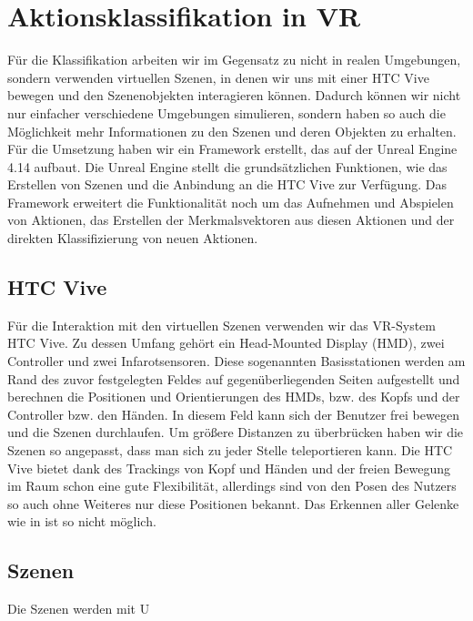 
\section{Aktionsklassifikation in VR}

Für die Klassifikation arbeiten wir im Gegensatz zu \cite{SceneGronk} nicht in realen Umgebungen, sondern verwenden virtuellen Szenen, in denen wir uns mit einer HTC Vive \cite{HTC-Vive} bewegen und den Szenenobjekten interagieren können. Dadurch können wir nicht nur einfacher verschiedene Umgebungen simulieren, sondern haben so auch die Möglichkeit mehr Informationen zu den Szenen und deren Objekten zu erhalten.
Für die Umsetzung haben wir ein Framework erstellt, das auf der Unreal Engine 4.14 \cite{UE4} aufbaut. Die Unreal Engine stellt die grundsätzlichen Funktionen, wie das Erstellen von Szenen und die Anbindung an die HTC Vive zur Verfügung. Das Framework erweitert die Funktionalität noch um das Aufnehmen und Abspielen von Aktionen, das Erstellen der Merkmalsvektoren aus diesen Aktionen \cite{Features} und der direkten Klassifizierung von neuen Aktionen.

\subsection{HTC Vive}
Für die Interaktion mit den virtuellen Szenen verwenden wir das VR-System HTC Vive. Zu dessen Umfang gehört ein Head-Mounted Display (HMD), zwei Controller und zwei Infarotsensoren. Diese sogenannten Basisstationen werden am Rand des zuvor festgelegten Feldes auf gegenüberliegenden Seiten aufgestellt und berechnen die Positionen und Orientierungen des HMDs, bzw. des Kopfs und der Controller bzw. den Händen. In diesem Feld kann sich der Benutzer frei bewegen und die Szenen durchlaufen. Um größere Distanzen zu überbrücken haben wir die Szenen so angepasst, dass man sich zu jeder Stelle teleportieren kann. Die HTC Vive bietet dank des Trackings von Kopf und Händen und der freien Bewegung im Raum schon eine gute Flexibilität, allerdings sind von den Posen des Nutzers so auch ohne Weiteres nur diese Positionen bekannt. Das Erkennen aller Gelenke wie in \cite{SceneGronk} ist so nicht möglich. \cite{FutureWork}

\subsection{Szenen}
Die Szenen werden mit U


